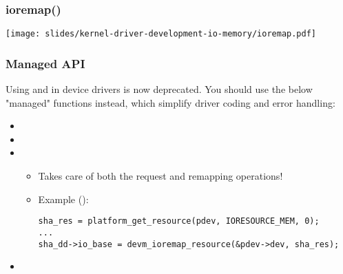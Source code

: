 \begin{frame}[fragile]
  \frametitle{ioremap()}
  \begin{center}
    \texttt{[image: slides/kernel-driver-development-io-memory/ioremap.pdf]}\\
  \end{center}
\end{frame}

\begin{frame}[fragile]
  \frametitle{Managed API}
  Using  and  in device
  drivers is now deprecated. You should use the below "managed"
  functions instead, which simplify driver coding and error handling:
  \begin{itemize}
  \item {}
  \item {}
  \item {}
        \begin{itemize}
	\item Takes care of both the request and remapping operations!
	\item Example ():
	\begin{block}{}
	\begin{verbatim}
sha_res = platform_get_resource(pdev, IORESOURCE_MEM, 0);
...
sha_dd->io_base = devm_ioremap_resource(&pdev->dev, sha_res);
	\end{verbatim}
	\end{block}{}
	\end{itemize}
  \item {}
  \end{itemize}
\end{frame}

